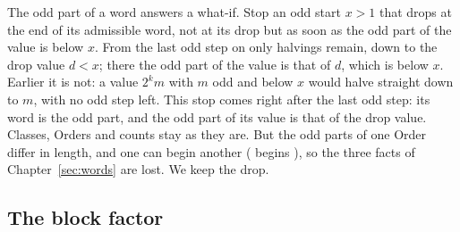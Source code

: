 \documentclass[11pt,a4paper,titlepage]{article}
\begin{document}
The odd part of a word answers a what-if. Stop an odd start $x > 1$ that drops at the end of its
admissible word, not at its drop but as soon as the odd part of the value is below $x$. From the last odd step on
only halvings remain, down to the drop value $d < x$; there the odd part of the
value is that of $d$, which is below $x$. Earlier it is not: a value $2^k m$
with $m$ odd and below $x$ would halve straight down to $m$, with no odd step
left. This stop comes right after the last odd step: its word is the odd part, and
the odd part of its value is that of the drop value. Classes, Orders and counts stay as
they are. But the odd parts of one Order differ in length, and one can begin
another ( begins ), so the three facts of
Chapter~\ref{sec:words} are lost. We keep the drop.

\subsection*{The block factor}
\end{document}
